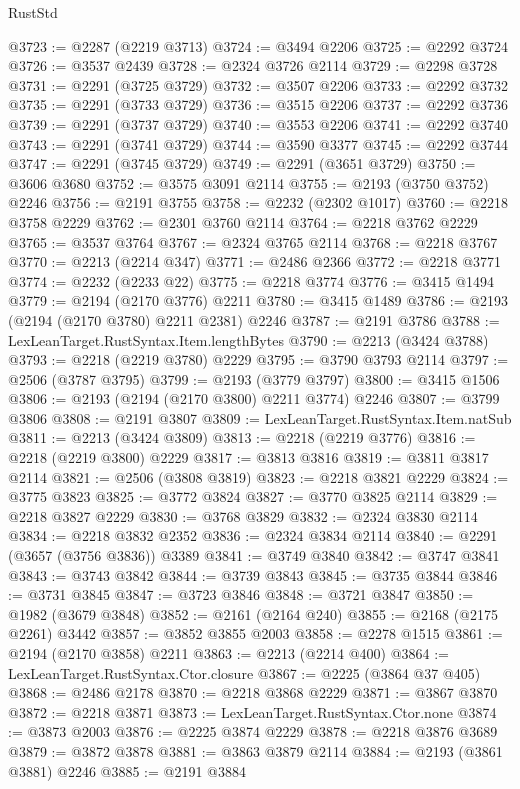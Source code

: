 \begin{lexlean}{RustStd}
\begin{coremodule}
@3723 := @2287 (@2219 @3713)
@3724 := @3494 @2206
@3725 := @2292 @3724
@3726 := @3537 @2439
@3728 := @2324 @3726 @2114
@3729 := @2298 @3728
@3731 := @2291 (@3725 @3729)
@3732 := @3507 @2206
@3733 := @2292 @3732
@3735 := @2291 (@3733 @3729)
@3736 := @3515 @2206
@3737 := @2292 @3736
@3739 := @2291 (@3737 @3729)
@3740 := @3553 @2206
@3741 := @2292 @3740
@3743 := @2291 (@3741 @3729)
@3744 := @3590 @3377
@3745 := @2292 @3744
@3747 := @2291 (@3745 @3729)
@3749 := @2291 (@3651 @3729)
@3750 := @3606 @3680
@3752 := @3575 @3091 @2114
@3755 := @2193 (@3750 @3752) @2246
@3756 := @2191 @3755
@3758 := @2232 (@2302 @1017)
@3760 := @2218 @3758 @2229
@3762 := @2301 @3760 @2114
@3764 := @2218 @3762 @2229
@3765 := @3537 @3764
@3767 := @2324 @3765 @2114
@3768 := @2218 @3767
@3770 := @2213 (@2214 @347)
@3771 := @2486 @2366
@3772 := @2218 @3771
@3774 := @2232 (@2233 @22)
@3775 := @2218 @3774
@3776 := @3415 @1494
@3779 := @2194 (@2170 @3776) @2211
@3780 := @3415 @1489
@3786 := @2193 (@2194 (@2170 @3780) @2211 @2381) @2246
@3787 := @2191 @3786
@3788 := LexLeanTarget.RustSyntax.Item.lengthBytes
@3790 := @2213 (@3424 @3788)
@3793 := @2218 (@2219 @3780) @2229
@3795 := @3790 @3793 @2114
@3797 := @2506 (@3787 @3795)
@3799 := @2193 (@3779 @3797)
@3800 := @3415 @1506
@3806 := @2193 (@2194 (@2170 @3800) @2211 @3774) @2246
@3807 := @3799 @3806
@3808 := @2191 @3807
@3809 := LexLeanTarget.RustSyntax.Item.natSub
@3811 := @2213 (@3424 @3809)
@3813 := @2218 (@2219 @3776)
@3816 := @2218 (@2219 @3800) @2229
@3817 := @3813 @3816
@3819 := @3811 @3817 @2114
@3821 := @2506 (@3808 @3819)
@3823 := @2218 @3821 @2229
@3824 := @3775 @3823
@3825 := @3772 @3824
@3827 := @3770 @3825 @2114
@3829 := @2218 @3827 @2229
@3830 := @3768 @3829
@3832 := @2324 @3830 @2114
@3834 := @2218 @3832 @2352
@3836 := @2324 @3834 @2114
@3840 := @2291 (@3657 (@3756 @3836)) @3389
@3841 := @3749 @3840
@3842 := @3747 @3841
@3843 := @3743 @3842
@3844 := @3739 @3843
@3845 := @3735 @3844
@3846 := @3731 @3845
@3847 := @3723 @3846
@3848 := @3721 @3847
@3850 := @1982 (@3679 @3848)
@3852 := @2161 (@2164 @240)
@3855 := @2168 (@2175 @2261) @3442
@3857 := @3852 @3855 @2003
@3858 := @2278 @1515
@3861 := @2194 (@2170 @3858) @2211
@3863 := @2213 (@2214 @400)
@3864 := LexLeanTarget.RustSyntax.Ctor.closure
@3867 := @2225 (@3864 @37 @405)
@3868 := @2486 @2178
@3870 := @2218 @3868 @2229
@3871 := @3867 @3870
@3872 := @2218 @3871
@3873 := LexLeanTarget.RustSyntax.Ctor.none
@3874 := @3873 @2003
@3876 := @2225 @3874 @2229
@3878 := @2218 @3876 @3689
@3879 := @3872 @3878
@3881 := @3863 @3879 @2114
@3884 := @2193 (@3861 @3881) @2246
@3885 := @2191 @3884

\end{coremodule}
\end{lexlean}
